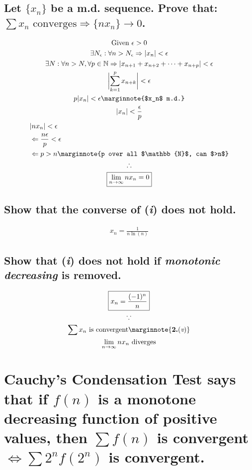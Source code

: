 \documentclass[letterpaper]{article}
\DeclarePairedDelimiter{\abs}{\lvert}{\rvert}
\begin{document}
\subsection{Let $\{x_n\}$ be a m.d. sequence. Prove that: $\sum x_n \text{ converges} \Rightarrow \{nx_n\}\rightarrow0$.}
\begin{gather*}
\text{Given }\epsilon>0 \\
\exists N_\epsilon:\forall n>N_\epsilon\Rightarrow|x_n|<\epsilon \\
\exists N:\forall n>N,\forall p\in\mathbb{N}\Rightarrow\abs{x_{n+1}+x_{n+2}+\dotsb+x_{n+p}}<\epsilon \\
\abs[\bigg]{\sum_{k=1}^{p}x_{n+k}}<\epsilon \\
p\abs{x_n}<\epsilon \marginnote{$x_n$ m.d.} \\
\abs{x_n}<\frac{\epsilon}{p} \\
\begin{aligned}
&\abs{nx_n}<\epsilon \\
&\Leftarrow \frac{n\epsilon}{p}<\epsilon \\
&\Leftarrow p>n \marginnote{p over all $\mathbb{N}$, can $>n$}
\end{aligned} \\
\therefore \\
\boxed{\lim_{n\rightarrow\infty}nx_n=0}
\end{gather*}
\subsection{Show that the converse of (\textit{i}) does not hold.}
\begin{gather*}
\boxed{x_n=\frac{1}{n\ln(n)}}
\end{gather*}
\subsection{Show that (\textit{i}) does not hold if \textit{monotonic decreasing} is removed.}
\begin{gather*}
\boxed{x_n=\frac{(-1)^n}{n}} \\
\because \\
\sum x_n\text{ is convergent} \marginnote{\textbf{2.}(\textit{v})} \\
\lim_{n\rightarrow\infty} nx_n\text{ diverges}
\end{gather*}

\section{\textbf{Cauchy’s Condensation Test} says that if $f(n)$ is a monotone decreasing function of positive values,
then $\sum f(n)$ is convergent $\Leftrightarrow\sum2^nf(2^n)$ is convergent.}
\end{document}
